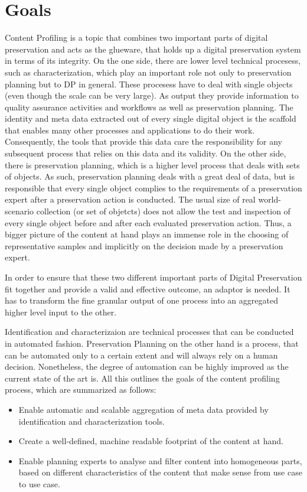 \section {Goals}
Content Profiling is a topic that combines two important parts of digital preservation and acts as the glueware, that holds up a digital preservation system in terms of its integrity. On the one side, there are lower level technical procesess, such as characterization, which play an important role not only to preservation planning but to DP in general. These procesess have to deal with single objects (even though the scale can be very large). As output they provide information to quality assurance activities and workflows as well as preservation planning. The identity and meta data extracted out of every single digital object is the scaffold that enables many other processes and applications to do their work. Consequently, the tools that provide this data care the responsibility for any subsequent process that relies on this data and its validity.
On the other side, there is preservation planning, which is a higher level process that deals with sets of objects. As such, preservation planning deals with a great deal of data, but is responsible that every single object complies to the requirements of a preservation expert after a preservation action is conducted. The usual size of real world-scenario collection (or set of objetcts) does not allow the test and inspection of every single object before and after each evaluated preservation action. Thus, a bigger picture of the content at hand plays an immense role in the choosing of representative samples and implicitly on the decision made by a preservation expert.

In order to ensure that these two different important parts of Digital Preservation fit together and provide a valid and effective outcome, an adaptor is needed. It has to transform the fine granular output of one process into an aggregated higher level input to the other.

Identification and characterizaion are technical processes that can be conducted in automated fashion. Preservation Planning on the other hand is a process, that can be automated only to a certain extent and will always rely on a human decision. Nonetheless, the degree of automation can be highly improved as the current state of the art is. All this outlines the goals of the content profiling process, which are summarized as follows:

\begin{itemize}
\item Enable automatic and scalable aggregation of meta data provided by identification and characterization tools.
\item Create a well-defined, machine readable footprint of the content at hand.
\item Enable planning experts to analyse and filter content into homogeneous parts, based on different characteristics of the content that make sense from use case to use case.
\end{itemize}

